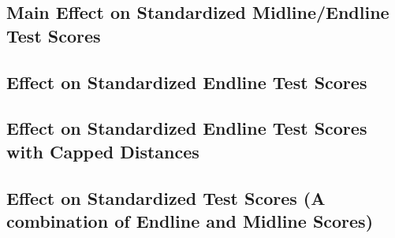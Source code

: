 \documentclass[11pt]{article}
\begin{document}
\begin{center}
{\renewcommand\normalsize{}\normalsize\singlespacing\setlength{\tabcolsep}{20pt}
} 
\end{center}

\clearpage
\subsection{Main Effect on Standardized Midline/Endline Test Scores}

\begin{center}
{\renewcommand\normalsize{}\normalsize\singlespacing\setlength{\tabcolsep}{20pt}
} 
\end{center}

\begin{center}
{\renewcommand\normalsize{}\normalsize\singlespacing\setlength{\tabcolsep}{20pt}
} 
\end{center}


\clearpage
\subsection{Effect on Standardized Endline Test Scores}
\begin{center}
{\renewcommand\normalsize{}\normalsize\singlespacing
} 
\end{center}

\begin{center}
{\renewcommand\normalsize{}\normalsize\singlespacing
} 
\end{center}

\clearpage
\subsection{Effect on Standardized Endline Test Scores with Capped Distances}
\begin{center}
{\renewcommand\normalsize{}\normalsize\singlespacing
} 
\end{center}


\clearpage
\subsection{Effect on Standardized Test Scores (A combination of Endline and Midline Scores)}
\end{document}
